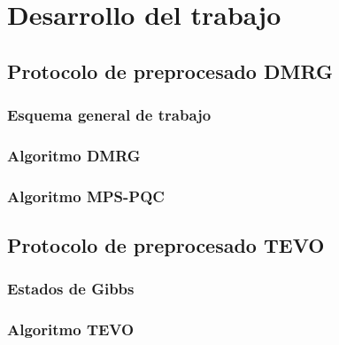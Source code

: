 \chapter{Desarrollo del trabajo}

\section{Protocolo de preprocesado DMRG}

\subsection{Esquema general de trabajo}
\subsection{Algoritmo DMRG}
\subsection{Algoritmo MPS-PQC}



\section{Protocolo de preprocesado TEVO}
\subsection{Estados de Gibbs}
\subsection{Algoritmo TEVO}
